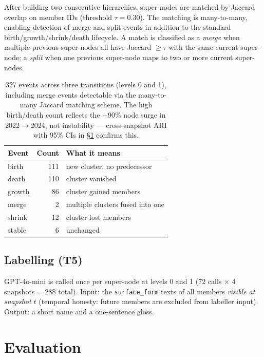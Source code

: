 \documentclass[10pt]{article}
\begin{document}
After building two consecutive hierarchies, super-nodes are matched by Jaccard
overlap on member IDs (threshold $\tau = 0.30$).
The matching is many-to-many, enabling detection of merge and split events in
addition to the standard birth/growth/shrink/death lifecycle.
A match is classified as a \emph{merge} when multiple previous super-nodes all
have Jaccard $\ge \tau$ with the same current super-node; a \emph{split} when
one previous super-node maps to two or more current super-nodes.

\begin{table}[h]
\centering\small
\begin{tabular}{lrl}
\toprule
Event & Count & What it means \\
\midrule
birth  & 111 & new cluster, no predecessor \\
death  & 110 & cluster vanished \\
growth & 86  & cluster gained members \\
merge  & 2   & multiple clusters fused into one \\
shrink & 12  & cluster lost members \\
stable & 6   & unchanged \\
\bottomrule
\end{tabular}
\caption{327 events across three transitions (levels 0 and 1), including
merge events detectable via the many-to-many Jaccard matching scheme.
The high birth/death count reflects the +90\% node surge in 2022$\to$2024,
not instability --- cross-snapshot ARI with 95\% CIs in §\ref{sec:eval} confirms this.}
\label{tab:events}
\end{table}

\subsection{Labelling (T5)}

GPT-4o-mini is called once per super-node at levels 0 and 1 (72 calls $\times$ 4
snapshots = 288 total).
Input: the \texttt{surface\_form} texts of all members \emph{visible at snapshot $t$}
(temporal honesty: future members are excluded from labeller input).
Output: a short name and a one-sentence gloss.

\section{Evaluation}\label{sec:eval}
\end{document}

